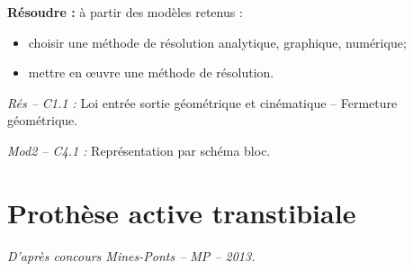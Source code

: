 \documentclass[10pt]{article}
\newif\ifprof
\begin{document}






\begin{comp}
\noindent \textbf{Résoudre :} à partir des modèles retenus :
\begin{itemize}
\item choisir une méthode de résolution analytique, graphique, numérique;
\item mettre en \oe{}uvre une méthode de résolution.
\end{itemize}

\noindent \textit{Rés -- C1.1 :} Loi entrée sortie géométrique et cinématique -- Fermeture géométrique.

\noindent \textit{Mod2 -- C4.1 :} Représentation par schéma bloc.
\end{comp}

\section*{Prothèse active transtibiale}

\begin{flushright}
\textit{D'après concours Mines-Ponts -- MP -- 2013.}
\end{flushright}

\ifprof
\else
\end{document}
